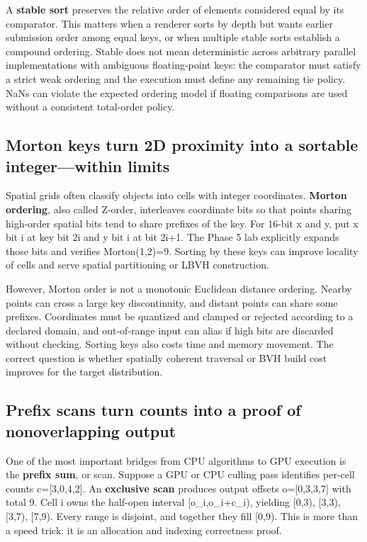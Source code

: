 A \textbf{stable sort} preserves the relative order of elements considered equal by its comparator. This matters when a renderer sorts by depth but wants earlier submission order among equal keys, or when multiple stable sorts establish a compound ordering. Stable does not mean deterministic across arbitrary parallel implementations with ambiguous floating-point keys: the comparator must satisfy a strict weak ordering and the execution must define any remaining tie policy. NaNs can violate the expected ordering model if floating comparisons are used without a consistent total-order policy.

\subsection{Morton keys turn 2D proximity into a sortable integer---within limits}\label{01-foundations-i-ch008-morton-keys-turn-2d-proximity-into-a-sortable-integerwithin-limits}

Spatial grids often classify objects into cells with integer coordinates. \textbf{Morton ordering}, also called Z-order, interleaves coordinate bits so that points sharing high-order spatial bits tend to share prefixes of the key. For 16-bit x and y, put x bit i at key bit 2i and y bit i at bit 2i+1. The Phase 5 lab explicitly expands those bits and verifies Morton(1,2)=9. Sorting by these keys can improve locality of cells and serve spatial partitioning or LBVH construction.

However, Morton order is not a monotonic Euclidean distance ordering. Nearby points can cross a large key discontinuity, and distant points can share some prefixes. Coordinates must be quantized and clamped or rejected according to a declared domain, and out-of-range input can alias if high bits are discarded without checking. Sorting keys also costs time and memory movement. The correct question is whether spatially coherent traversal or BVH build cost improves for the target distribution.

\subsection{Prefix scans turn counts into a proof of nonoverlapping output}\label{01-foundations-i-ch008-prefix-scans-turn-counts-into-a-proof-of-nonoverlapping-output}

One of the most important bridges from CPU algorithms to GPU execution is the \textbf{prefix sum}, or scan. Suppose a GPU or CPU culling pass identifies per-cell counts c={[}3,0,4,2{]}. An \textbf{exclusive scan} produces output offsets o={[}0,3,3,7{]} with total 9. Cell i owns the half-open interval {[}o\_i,o\_i+c\_i), yielding {[}0,3), {[}3,3), {[}3,7), {[}7,9). Every range is disjoint, and together they fill {[}0,9). This is more than a speed trick: it is an allocation and indexing correctness proof.

